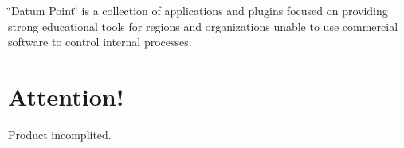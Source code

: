 \char`\"{}\+Datum Point\char`\"{} is a collection of applications and plugins focused on providing strong educational tools for regions and organizations unable to use commercial software to control internal processes.

\section*{Attention!}

Product incomplited. 